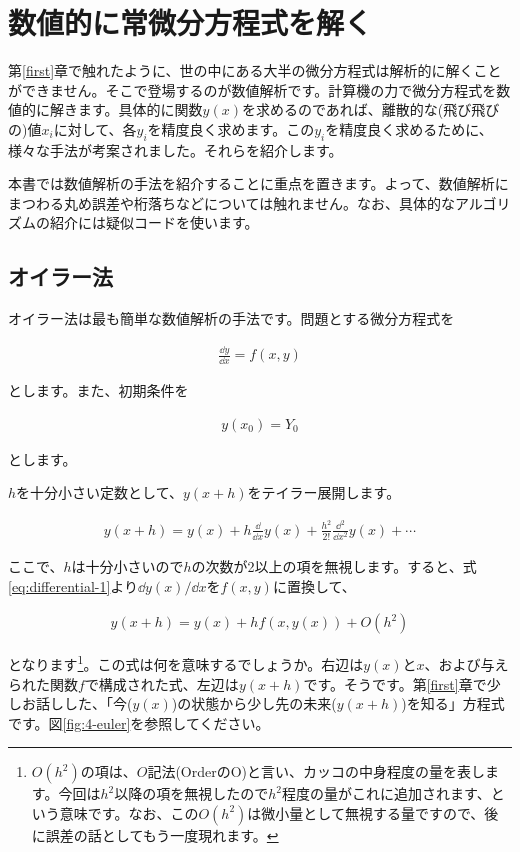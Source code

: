 \chapter{数値的に常微分方程式を解く}
\label{numerical-ordinary}
第\ref{first}章で触れたように、世の中にある大半の微分方程式は解析的に解くことができません。そこで登場するのが数値解析です。計算機の力で微分方程式を数値的に解きます。具体的に関数$y(x)$を求めるのであれば、離散的な(飛び飛びの)値$x_i$に対して、各$y_i$を精度良く求めます。この$y_i$を精度良く求めるために、様々な手法が考案されました。それらを紹介します。

本書では数値解析の手法を紹介することに重点を置きます。よって、数値解析にまつわる丸め誤差や桁落ちなどについては触れません。なお、具体的なアルゴリズムの紹介には疑似コードを使います。






\section{オイラー法}
\label{euler-numerical}
オイラー法は最も簡単な数値解析の手法です。問題とする微分方程式を

\begin{eqnarray}
    \frac{\dd y}{\dd x}=f(x,y)
    \label{eq:differential-1}
\end{eqnarray}

\noindent
とします。また、初期条件を

\begin{eqnarray}
    y(x_0)=Y_0
    \label{eq:terms-1}
\end{eqnarray}

\noindent
とします。

$h$を十分小さい定数として、$y(x+h)$をテイラー展開します。

\begin{eqnarray}
    y(x+h)=y(x)+h\frac{\dd}{\dd x}y(x)+\frac{h^2}{2!}\frac{\dd^2}{\dd x^2}y(x)+\cdots
    \label{eq:taylor}
\end{eqnarray}

ここで、$h$は十分小さいので$h$の次数が2以上の項を無視します。すると、式\ref{eq:differential-1}より$\dd y(x)/\dd x$を$f(x,y)$に置換して、

\begin{eqnarray}
    y(x+h)=y(x)+hf(x,y(x))+O(h^2)
\end{eqnarray}

\noindent
となります\footnote{$O(h^2)の項は、$$O$記法(OrderのO)と言い、カッコの中身程度の量を表します。今回は$h^2$以降の項を無視したので$h^2$程度の量がこれに追加されます、という意味です。なお、この$O(h^2)$は微小量として無視する量ですので、後に誤差の話としてもう一度現れます。}。この式は何を意味するでしょうか。右辺は$y(x)$と$x$、および与えられた関数$f$で構成された式、左辺は$y(x+h)$です。そうです。第\ref{first}章で少しお話しした、「今($y(x)$)の状態から少し先の未来($y(x+h)$)を知る」方程式です。図\ref{fig:4-euler}を参照してください。

